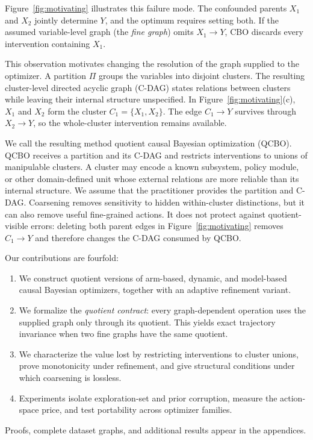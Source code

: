 \documentclass[twoside]{article}
\begin{document}
Figure~\ref{fig:motivating} illustrates this failure mode. The confounded parents $X_1$ and $X_2$ jointly determine $Y$, and the optimum requires setting both. If the assumed variable-level graph (the \emph{fine graph}) omits $X_1\to Y$, CBO discards every intervention containing $X_1$.

This observation motivates changing the resolution of the graph supplied to the optimizer. A partition $\Pi$ groups the variables into disjoint clusters. The resulting cluster-level directed acyclic graph (C-DAG) states relations between clusters while leaving their internal structure unspecified. In Figure~\ref{fig:motivating}(c), $X_1$ and $X_2$ form the cluster $C_1=\{X_1,X_2\}$. The edge $C_1\to Y$ survives through $X_2\to Y$, so the whole-cluster intervention remains available.

We call the resulting method quotient causal Bayesian optimization (QCBO). QCBO receives a partition and its C-DAG and restricts interventions to unions of manipulable clusters. A cluster may encode a known subsystem, policy module, or other domain-defined unit whose external relations are more reliable than its internal structure. We assume that the practitioner provides the partition and C-DAG. Coarsening removes sensitivity to hidden within-cluster distinctions, but it can also remove useful fine-grained actions. It does not protect against quotient-visible errors: deleting both parent edges in Figure~\ref{fig:motivating} removes $C_1\to Y$ and therefore changes the C-DAG consumed by QCBO.

Our contributions are fourfold:
\begin{enumerate}[leftmargin=1.5em,itemsep=2pt,topsep=2pt]
  \item We construct quotient versions of arm-based, dynamic, and model-based
  causal Bayesian optimizers, together with an adaptive refinement variant.
  \item We formalize the \emph{quotient contract}: every graph-dependent
  operation uses the supplied graph only through its quotient. This yields
  exact trajectory invariance when two fine graphs have the same quotient.
  \item We characterize the value lost by restricting interventions to
  cluster unions, prove monotonicity under refinement, and give structural
  conditions under which coarsening is lossless.
  \item Experiments isolate exploration-set and prior corruption, measure the
  action-space price, and test portability across optimizer families.
\end{enumerate}
Proofs, complete dataset graphs, and additional results appear in the appendices.
\end{document}

